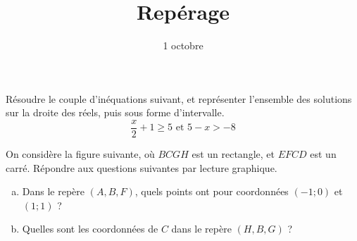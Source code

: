 \documentclass[12pt]{article}
\title{Rep\'erage}
\date{1\up{er} octobre}
\begin{document}
\maketitle

\begin{exercice}
Résoudre le couple d'inéquations suivant, et représenter l'ensemble des solutions sur la droite des réels, puis sous forme d'intervalle.
\[\frac{x}{2}+1\geq5 \text{ et } 5-x>-8\]
\end{exercice}

\begin{exercice}
On considère la figure suivante, où $BCGH$ est un rectangle, et $EFCD$ est un carré. Répondre aux questions suivantes par lecture graphique.

\begin{multicols}{2}

\begin{center}
\end{center}


\begin{enumerate}[(a)]
  \item Dans le repère $(A, B, F)$, quels points ont pour coordonnées $(-1;0)$ et $(1; 1)$ ?
  \item Quelles sont les coordonnées de $C$ dans le repère $(H, B, G)$ ?
\end{enumerate}
\end{multicols}

\end{exercice}
\end{document}
